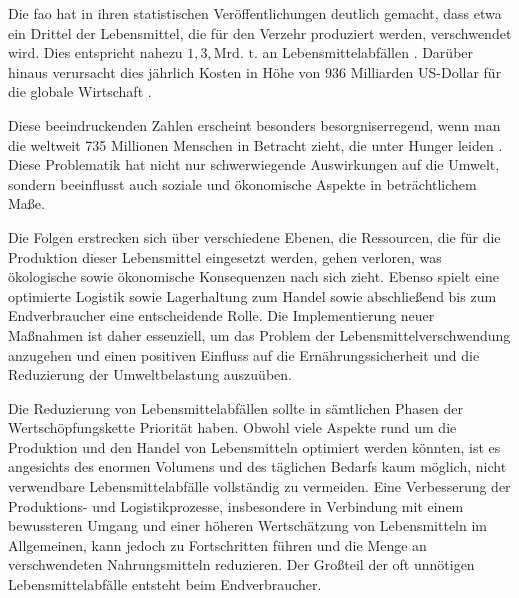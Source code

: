 Die \ac{fao} hat in ihren statistischen Veröffentlichungen deutlich gemacht, dass etwa ein Drittel der Lebensmittel, die für den Verzehr produziert werden, verschwendet wird. Dies entspricht nahezu $1,3,\text{Mrd. t.}$ an Lebensmittelabfällen \cite{Cederberg.2011}. Darüber hinaus verursacht dies jährlich Kosten in Höhe von 936 Milliarden US-Dollar für die globale Wirtschaft \cite{Jamaludin.2022}.

Diese beeindruckenden Zahlen erscheint besonders besorgniserregend, wenn man die weltweit 735 Millionen Menschen in Betracht zieht, die unter Hunger leiden \cite{StatistischesBundesamt.2022b}. Diese Problematik hat nicht nur schwerwiegende Auswirkungen auf die Umwelt, sondern beeinflusst auch soziale und ökonomische Aspekte in beträchtlichem Maße.

Die Folgen erstrecken sich über verschiedene Ebenen, die Ressourcen, die für die Produktion dieser Lebensmittel eingesetzt werden, gehen verloren, was ökologische sowie ökonomische Konsequenzen nach sich zieht. Ebenso spielt eine optimierte Logistik sowie Lagerhaltung zum Handel sowie abschließend bis zum Endverbraucher eine entscheidende Rolle. Die Implementierung neuer Maßnahmen ist daher essenziell, um das Problem der Lebensmittelverschwendung anzugehen und einen positiven Einfluss auf die Ernährungssicherheit und die Reduzierung der Umweltbelastung auszuüben.

Die Reduzierung von Lebensmittelabfällen sollte in sämtlichen Phasen der Wertschöpfungskette Priorität haben. Obwohl viele Aspekte rund um die Produktion und den Handel von Lebensmitteln optimiert werden könnten, ist es angesichts des enormen Volumens und des täglichen Bedarfs kaum möglich, nicht verwendbare Lebensmittelabfälle vollständig zu vermeiden. Eine Verbesserung der Produktions- und Logistikprozesse, insbesondere in Verbindung mit einem bewussteren Umgang und einer höheren Wertschätzung von Lebensmitteln im Allgemeinen, kann jedoch zu Fortschritten führen und die Menge an verschwendeten Nahrungsmitteln reduzieren. Der Großteil der oft unnötigen Lebensmittelabfälle entsteht beim Endverbraucher.


